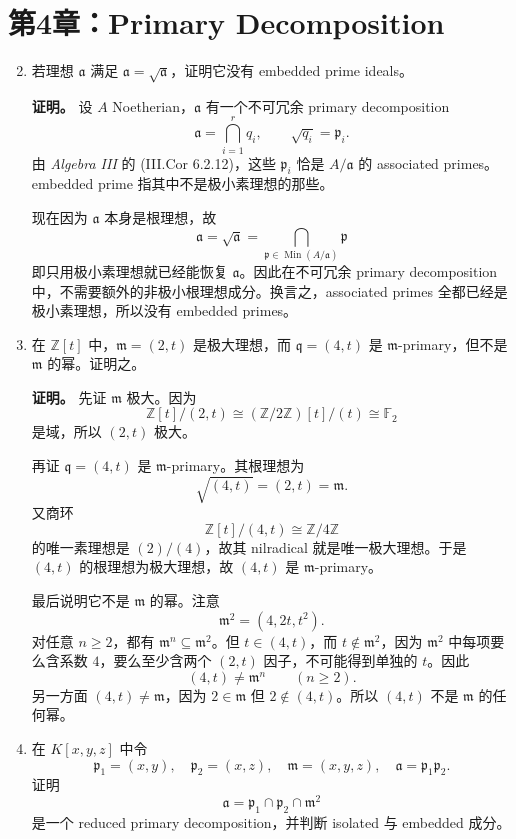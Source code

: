 \documentclass[a4paper]{ctexart}
\begin{document}
\section{第4章：Primary Decomposition}

\begin{enumerate}[leftmargin=*, label=\textbf{4.\arabic*.}]
\setcounter{enumi}{1}
\item 若理想 \(\mathfrak a\) 满足 \(\mathfrak a=\sqrt{\mathfrak a}\)，证明它没有 embedded prime ideals。

\textbf{证明。}
设 \(A\) Noetherian，\(\mathfrak a\) 有一个不可冗余 primary decomposition
\[
\mathfrak a=\bigcap_{i=1}^r q_i,\qquad \sqrt{q_i}=\mathfrak p_i.
\]
由 \textit{Algebra III} 的 (III.Cor 6.2.12)，这些 \(\mathfrak p_i\) 恰是 \(A/\mathfrak a\) 的 associated primes。embedded prime 指其中不是极小素理想的那些。

现在因为 \(\mathfrak a\) 本身是根理想，故
\[
\mathfrak a=\sqrt{\mathfrak a}=\bigcap_{\mathfrak p\in \operatorname{Min}(A/\mathfrak a)}\mathfrak p
\]
即只用极小素理想就已经能恢复 \(\mathfrak a\)。因此在不可冗余 primary decomposition 中，不需要额外的非极小根理想成分。换言之，associated primes 全都已经是极小素理想，所以没有 embedded primes。

\setcounter{enumi}{3}
\item 在 \(\mathbb Z[t]\) 中，\(\mathfrak m=(2,t)\) 是极大理想，而 \(\mathfrak q=(4,t)\) 是 \(\mathfrak m\)-primary，但不是 \(\mathfrak m\) 的幂。证明之。

\textbf{证明。}
先证 \(\mathfrak m\) 极大。因为
\[
\mathbb Z[t]/(2,t)\cong (\mathbb Z/2\mathbb Z)[t]/(t)\cong \mathbb F_2
\]
是域，所以 \((2,t)\) 极大。

再证 \(\mathfrak q=(4,t)\) 是 \(\mathfrak m\)-primary。其根理想为
\[
\sqrt{(4,t)}=(2,t)=\mathfrak m.
\]
又商环
\[
\mathbb Z[t]/(4,t)\cong \mathbb Z/4\mathbb Z
\]
的唯一素理想是 \((2)/(4)\)，故其 nilradical 就是唯一极大理想。于是 \((4,t)\) 的根理想为极大理想，故 \((4,t)\) 是 \(\mathfrak m\)-primary。

最后说明它不是 \(\mathfrak m\) 的幂。注意
\[
\mathfrak m^2=(4,2t,t^2).
\]
对任意 \(n\ge 2\)，都有 \(\mathfrak m^n\subseteq \mathfrak m^2\)。但 \(t\in (4,t)\)，而 \(t\notin \mathfrak m^2\)，因为 \(\mathfrak m^2\) 中每项要么含系数 \(4\)，要么至少含两个 \((2,t)\) 因子，不可能得到单独的 \(t\)。因此
\[
(4,t)\neq \mathfrak m^n\qquad (n\ge 2).
\]
另一方面 \((4,t)\neq \mathfrak m\)，因为 \(2\in \mathfrak m\) 但 \(2\notin (4,t)\)。所以 \((4,t)\) 不是 \(\mathfrak m\) 的任何幂。

\setcounter{enumi}{4}
\item 在 \(K[x,y,z]\) 中令
\[
\mathfrak p_1=(x,y),\quad \mathfrak p_2=(x,z),\quad \mathfrak m=(x,y,z),\quad \mathfrak a=\mathfrak p_1\mathfrak p_2.
\]
证明
\[
\mathfrak a=\mathfrak p_1\cap \mathfrak p_2\cap \mathfrak m^2
\]
是一个 reduced primary decomposition，并判断 isolated 与 embedded 成分。


\end{enumerate}
\end{document}

